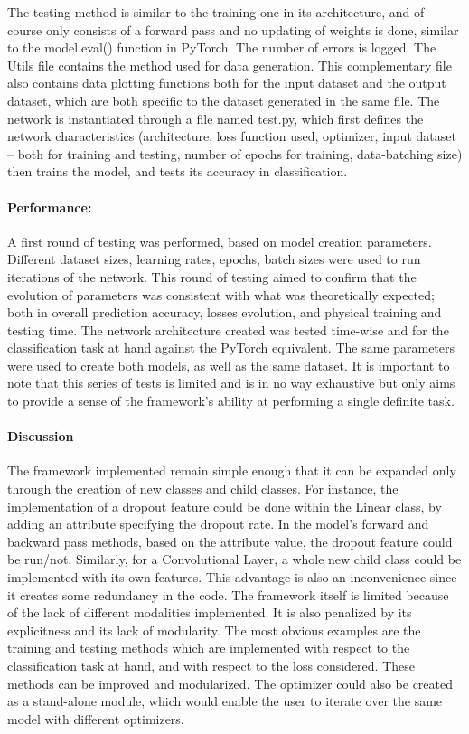 \documentclass[11pt, a4paper]{article}
\begin{document}
The testing method is similar to the training one in its architecture, and of course only consists of a forward pass and no updating of weights is done, similar to the model.eval() function in PyTorch. The number of errors is logged. 
The Utils file contains the method used for data generation. This complementary file also contains data plotting functions both for the input dataset and the output dataset, which are both specific to the dataset generated in the same file.
The network is instantiated through a file named test.py, which first defines the network characteristics (architecture, loss function used, optimizer, input dataset -- both for training and testing, number of epochs for training, data-batching size) then trains the model, and tests its accuracy in classification. 


\paragraph{Performance:}A first round of testing was performed, based on model creation parameters. Different dataset sizes, learning rates, epochs, batch sizes were used to run iterations of the network. This round of testing aimed to confirm that the evolution of parameters was consistent with what was theoretically expected; both in overall prediction accuracy, losses evolution, and physical training and testing time. 
The network architecture created was tested time-wise and for the classification task at hand against the PyTorch equivalent. The same parameters were used to create both models, as well as the same dataset.
It is important to note that this series of tests is limited and is in no way exhaustive but only aims to provide a sense of the framework's ability at performing a single definite task.

\paragraph{Discussion}The framework implemented remain simple enough that it can be expanded only through the creation of new classes and child classes. For instance, the implementation of a dropout feature could be done within the Linear class, by adding an attribute specifying the dropout rate. In the model's forward and backward pass methods, based on the attribute value, the dropout feature could be run/not. Similarly, for a Convolutional Layer, a whole new child class could be implemented with its own features. 
This advantage is also an inconvenience since it creates some redundancy in the code. 
The framework itself is limited because of the lack of different modalities implemented. It is also penalized by its explicitness and its lack of modularity.
The most obvious examples are the training and testing methods which are implemented with respect to the classification task at hand, and with respect to the loss considered. These methods can be improved and modularized. 
The optimizer could also be created as a stand-alone module, which would enable the user to iterate over the same model with different optimizers.
\end{document}
